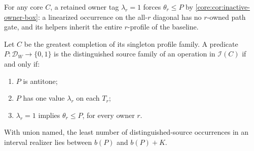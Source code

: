 For any core $C$, a retained owner tag $\lambda_r=1$ forces
$\theta_r\leq P$ by \cref{core:cor:inactive-owner-box}: a linearized
occurrence on the all-$r$ diagonal has no $r$-owned path gate, and its
helpers inherit the entire $r$-profile of the baseline.

\begin{theorem}
\label{core:thm:profile-source-interval}
Let $C$ be the greatest completion of its singleton profile family.
A predicate $P:\mathcal D_W\to\{0,1\}$ is the distinguished source
family of an operation in $\mathcal I(C)$ if and only if:
\begin{enumerate}
\item $P$ is antitone;
\item $P$ has one value $\lambda_r$ on each $T_r$;
\item $\lambda_r=1$ implies $\theta_r\leq P$, for every owner $r$.
\end{enumerate}
With union named, the least number of distinguished-source occurrences
in an interval realizer lies between $b(P)$ and $b(P)+K$.
\end{theorem}
